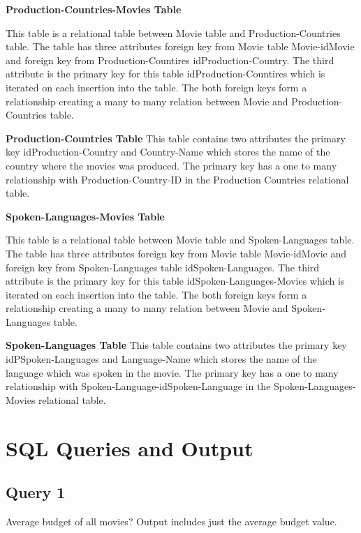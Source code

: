 \documentclass{article}
\begin{document}
\textbf{Production-Countries-Movies Table}

This table is a relational table between Movie table and Production-Countries table. The table has three attributes foreign key from Movie table Movie-idMovie and foreign key from Production-Countires idProduction-Country. The third attribute is the primary key for this table idProduction-Countires which is iterated on each insertion into the table. The both foreign keys form a relationship creating a many to many relation between Movie and Production-Countries table.\newline

\textbf{Production-Countries Table}
This table contains two attributes the primary key idProduction-Country and Country-Name which stores the name of the country where the movies was produced. The primary key has a one to many relationship with Production-Country-ID in the Production Countries relational table.\newline 

\textbf{Spoken-Languages-Movies Table}

This table is a relational table between Movie table and Spoken-Languages table. The table has three attributes foreign key from Movie table Movie-idMovie and foreign key from Spoken-Languages table idSpoken-Languages. The third attribute is the primary key for this table idSpoken-Languages-Movies which is iterated on each insertion into the table. The both foreign keys form a relationship creating a many to many relation between Movie and Spoken-Languages table.\newline 

\textbf{Spoken-Languages Table}
This table contains two attributes the primary key idPSpoken-Languages and Language-Name which stores the name of the language which was spoken in the movie. The primary key has a one to many relationship with Spoken-Language-idSpoken-Language in the Spoken-Languages-Movies relational table.\newline 

\pagebreak

\section{SQL Queries and Output}

\subsection{Query 1}
Average budget of all movies? Output includes just the average budget value.
\end{document}
